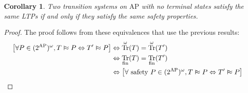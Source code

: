 \documentclass{tufte-handout} %
\newtheorem{cor}[thm]{Corollary}
\theoremstyle{definition}
\theoremstyle{remark}
\newcommand{\0}{\textsf{0}}
\newcommand{\1}{\textsf{1}}
\newcommand{\AP}{\text{AP}}
\DeclareMathOperator{\Tr}{Tr}
\newcommand{\vSim}{\mathrel{\scalebox{1}[1.5]{$\shortmid$}\mkern-3.5mu\raisebox{0.1ex}{$\approx$}}}
\begin{document}
\begin{cor}
	Two transition systems on $\AP$ with no terminal states satisfy the same LTPs if and only if they satisfy the same safety properties.
\end{cor}
\begin{proof}
	The proof follows from these equivalences that use the previous results:
	\begin{align*}\left[\forall P \in (2^{\AP})^{\omega}, T \vSim P \Leftrightarrow T' \vSim P\right] &\Leftrightarrow \Tr^{\omega}(T) = \Tr^{\omega}(T') \\&\Leftrightarrow \Tr_{\text{fin}}(T) = \Tr_{\text{fin}}(T')\\
	&\Leftrightarrow \left[\forall \text{ safety }P \in (2^{\AP})^{\omega}, T \vSim P \Leftrightarrow T' \vSim P\right] \end{align*}
\end{proof}
\end{document}
